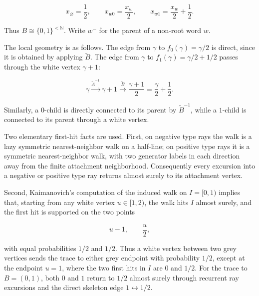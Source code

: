\documentclass[11pt,a4paper]{scrartcl}
\begin{document}
\[
x_\varnothing=\frac12,
\qquad
x_{w0}=\frac{x_w}{2},
\qquad
x_{w1}=\frac{x_w}{2}+\frac12 .
\]

Thus \(B\cong\{0,1\}^{<\mathbb N}\). Write \(w^-\) for the parent of a
non-root word \(w\).

The local geometry is as follows. The edge from \(\gamma\) to
\(f_0(\gamma)=\gamma/2\) is direct, since it is obtained by applying
\(\widetilde B\). The edge from \(\gamma\) to
\(f_1(\gamma)=\gamma/2+1/2\) passes through the white vertex \(\gamma+1\):

\[
\gamma
\xrightarrow{\widetilde A^{-1}}
\gamma+1
\xrightarrow{\widetilde B}
\frac{\gamma+1}{2}
=
\frac{\gamma}{2}+\frac12 .
\]

Similarly, a \(0\)-child is directly connected to its parent by
\(\widetilde B^{-1}\), while a \(1\)-child is connected to its parent through
a white vertex.

Two elementary first-hit facts are used. First, on negative type rays the walk
is a lazy symmetric nearest-neighbor walk on a half-line; on positive type rays
it is a symmetric nearest-neighbor walk, with two generator labels in each
direction away from the finite attachment neighborhood. Consequently every
excursion into a negative or positive type ray returns almost surely to its
attachment vertex.

Second, Kaimanovich's computation of the induced walk on \(I=[0,1)\) implies
that, starting from any white vertex \(u\in[1,2)\), the walk hits \(I\) almost
surely, and the first hit is supported on the two points

\[
u-1,
\qquad
\frac{u}{2},
\]

with equal probabilities \(1/2\) and \(1/2\). Thus a white vertex between two
grey vertices sends the trace to either grey endpoint with probability
\(1/2\), except at the endpoint \(u=1\), where the two first hits in \(I\) are
\(0\) and \(1/2\). For the trace to \(B=(0,1)\), both \(0\) and \(1\) return
to \(1/2\) almost surely through recurrent ray excursions and the direct
skeleton edge \(1\leftrightarrow1/2\).
\end{document}
